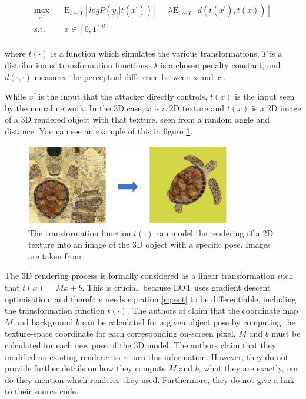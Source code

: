 \begin{equation}
\label{eq:eot}
\begin{aligned}
\max_{x^\prime} \quad & \mathrm{E}_{t\sim T}[log P(y_{t} | t(x^\prime))] - \lambda \mathrm{E}_{t\sim T}[d(t(x^\prime), t(x))]\\
\textrm{s.t.} \quad & x \in [0, 1]^d   \\
\end{aligned}
\end{equation}

\noindent where $t(\cdot)$ is a function which simulates the various transformations, $T$ is a distribution of transformation functions, $\lambda$ is a chosen penalty constant, and $d(\cdot, \cdot)$ measures the perceptual difference between x and $x^\prime$.

While $x^\prime$ is the input that the attacker directly controls, $t(x)$ is the input seen by the neural network. In the 3D case, $x$ is a 2D texture and $t(x)$ is a 2D image of a 3D rendered object with that texture, seen from a random angle and distance. You can see an example of this in figure \ref{fig:rendering}. 

\begin{figure}[h]
    \centering
    \includegraphics[width=0.8\textwidth]{graphics/rendering.JPG}
    \caption{The transformation function $t(\cdot)$ can model the rendering of a 2D texture into an image of the 3D object with a specific pose. Images are taken from \cite{athalye}.}
    \label{fig:rendering}
\end{figure}

The 3D rendering process is formally considered as a linear transformation such that $t(x) = Mx + b$. This is crucial, because EOT uses gradient descent optimisation, and therefore needs equation \ref{eq:eot} to be differentiable, including the transformation function $t(\cdot)$. The authors of \cite{athalye} claim that the coordinate map $M$ and background $b$ can be calculated for a given object pose by computing the texture-space coordinate for each corresponding on-screen pixel. $M$ and $b$ must be calculated for each new pose of the 3D model. The authors claim that they modified an existing renderer to return this information. However, they do not provide further details on how they compute $M$ and $b$, what they are exactly, nor do they mention which renderer they used. Furthermore, they do not give a link to their source code.

